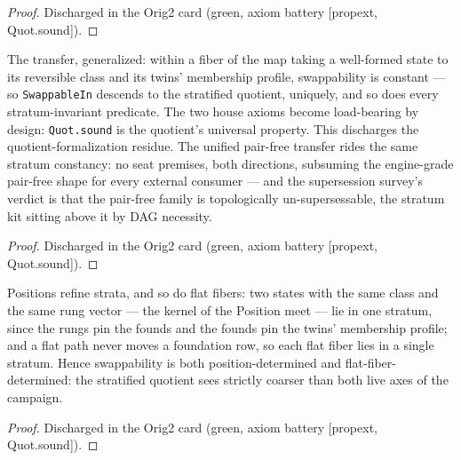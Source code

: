 \begin{proof}
\leanok
Discharged in the Orig2 card (green, axiom battery [propext, Quot.sound]).
\end{proof}

\begin{theorem}\label{thm:stratifiedQuotient}
\leanok
{}
The transfer, generalized: within a fiber of the map taking a
well-formed state to its reversible class and its twins'
membership profile, swappability is constant --- so
\texttt{SwappableIn} descends to the stratified quotient,
uniquely, and so does every stratum-invariant predicate.  The
two house axioms become load-bearing by design:
\texttt{Quot.sound} is the quotient's universal property.  This
discharges the quotient-formalization residue.  The unified
pair-free transfer rides the same stratum constancy: no seat
premises, both directions, subsuming the engine-grade pair-free
shape for every external consumer --- and the supersession
survey's verdict is that the pair-free family is topologically
un-supersessable, the stratum kit sitting above it by DAG
necessity.
\end{theorem}

\begin{proof}
\leanok
Discharged in the Orig2 card (green, axiom battery [propext, Quot.sound]).
\end{proof}

\begin{theorem}\label{thm:stratificationLink}
\leanok
{}
Positions refine strata, and so do flat fibers: two states with
the same class and the same rung vector --- the kernel of the
Position meet --- lie in one stratum, since the rungs pin the
founds and the founds pin the twins' membership profile; and a
flat path never moves a foundation row, so each flat fiber lies
in a single stratum.  Hence swappability is both
position-determined and flat-fiber-determined: the stratified
quotient sees strictly coarser than both live axes of the
campaign.
\end{theorem}

\begin{proof}
\leanok
Discharged in the Orig2 card (green, axiom battery [propext, Quot.sound]).
\end{proof}

